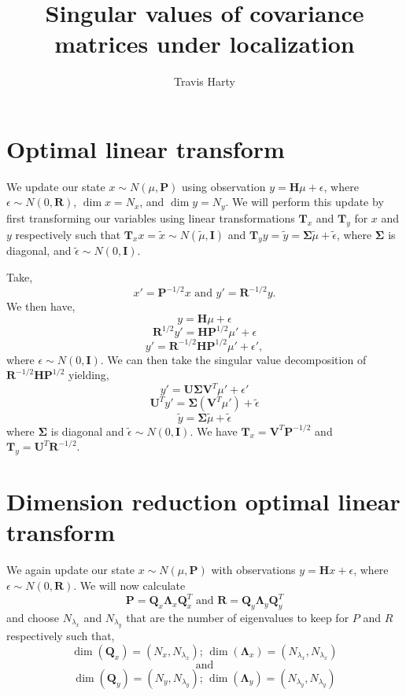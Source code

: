 \documentclass[11pt]{article} %
\title{Singular values of covariance matrices under localization}
\author{Travis Harty}
\date{} %
\newcommand{\mat}{\mathbf}
\begin{document}
\maketitle

\section{Optimal linear transform}

We update our state $x\sim N(\mu, \mat{P})$ using observation
$y = \mat{H} \mu + \epsilon$, where $\epsilon \sim N(0, \mat{R})$,
$\dim{x} = N_x$, and $\dim{y} = N_y$.
We will perform this update by first transforming our variables using
linear transformations $\mat{T}_x$ and $\mat{T}_y$ for $x$ and $y$ respectively
such that $\mat{T}_x x = \tilde{x} \sim N(\tilde{\mu}, \mat{I})$ and
$\mat{T}_y y = \tilde{y} = \mat{\Sigma} \tilde{\mu} + \tilde{\epsilon}$, where
$\mat{\Sigma}$ is diagonal, and $\tilde{\epsilon} \sim N(0, \mat{I})$.

Take,
\[
  x' = \mat{P}^{-1/2} x
  \text{ and }
  y' = \mat{R}^{-1/2} y.
\]
We then have,
\[
  y = \mat{H} \mu + \epsilon
\]
\[
  \mat{R}^{1/2} y' = \mat{H}
  \mat{P}^{1/2} \mu' + \epsilon
\]
\[
  y' = \mat{R}^{-1/2}\mat{H}
  \mat{P}^{1/2} \mu' + \epsilon',
\]
where $\epsilon \sim N(0, \mat{I})$.
We can then take the singular value decomposition of
$\mat{R}^{-1/2} \mat{H} \mat{P}^{1/2}$ yielding,
\[
  y' = \mat{U} \mat{\Sigma} \mat{V}^{T} \mu' + \epsilon'
\]
\[
  \mat{U}^T y' = \mat{\Sigma} (\mat{V}^T \mu') + \tilde{\epsilon}
\]
\[
  \tilde{y}= \mat{\Sigma} \tilde{\mu} + \tilde{\epsilon}
\]
where $\mat{\Sigma}$ is diagonal and $\tilde{\epsilon} \sim N(0,
\mat{I})$.
We have $\mat{T}_x = \mat{V}^T \mat{P}^{-1/2}$ and
$\mat{T}_y = \mat{U}^T \mat{R}^{-1/2}$.





\section{Dimension reduction optimal linear transform}

We again update our state $x \sim N(\mu, \mat{P})$ with
observations $y = \mat{H} x + \epsilon$, where $\epsilon \sim N(0,
\mat{R})$.
We will now calculate
\[
  \mat{P} = \mat{Q}_x \mat{\Lambda}_x \mat{Q}_x^T
  \text{ and }
  \mat{R} = \mat{Q}_y \mat{\Lambda}_y \mat{Q}_y^T
\]
and choose $N_{\lambda_x}$ and $N_{\lambda_y}$ that are the number of
eigenvalues to keep for $P$ and $R$ respectively such that,
\[
  \dim(\mat{Q}_x) = (N_x, N_{\lambda_x})\text{; }\dim(\mat{\Lambda}_x) =
  (N_{\lambda_x}, N_{\lambda_x})
\]
\[
  \text{ and }
\]
\[
  \dim(\mat{Q}_y) = (N_y, N_{\lambda_y})\text{; }\dim(\mat{\Lambda}_y) =
  (N_{\lambda_y}, N_{\lambda_y})
\]
\end{document}
